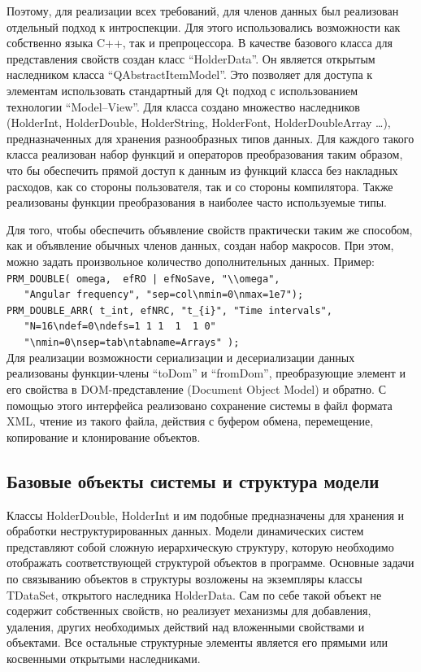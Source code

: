 Поэтому, для реализации всех требований,
для членов данных был реализован отдельный подход к интроспекции.
Для этого использовались возможности как собственно языка C++, так и препроцессора.
В качестве базового класса для представления свойств
создан класс ``HolderData''. Он является открытым наследником
класса ``QAbstractItemModel''. Это позволяет для доступа
к элементам использовать стандартный для Qt подход с
использованием технологии ``Model--View''.
Для класса создано множество наследников
(HolderInt, HolderDouble, HolderString, HolderFont, HolderDoubleArray \ldots),
предназначенных для хранения разнообразных типов данных.
Для каждого такого класса реализован набор функций и операторов преобразования
таким образом, что бы обеспечить прямой доступ к данным из функций класса
без накладных расходов, как со стороны пользователя, так и со стороны
компилятора. Также реализованы функции преобразования в наиболее часто
используемые типы.

Для того, чтобы обеспечить объявление свойств практически таким же способом,
как и объявление обычных членов данных, создан набор макросов.
При этом, можно задать произвольное количество дополнительных данных.
Пример: \\
\verb!PRM_DOUBLE( omega,  efRO | efNoSave, "\\omega",! \\
\verb!   "Angular frequency", "sep=col\nmin=0\nmax=1e7");! \\
\verb!PRM_DOUBLE_ARR( t_int, efNRC, "t_{i}", "Time intervals",!\\
\verb!   "N=16\ndef=0\ndefs=1 1 1  1  1 0"! \\
\verb!   "\nmin=0\nsep=tab\ntabname=Arrays" );!\\

Для реализации возможности сериализации и десериализации данных
реализованы функции-члены ``toDom'' и ``fromDom'',
преобразующие элемент и его свойства в DOM-представление (Document Object Model)
и обратно. С помощью этого интерфейса реализовано сохранение системы
в файл формата XML, чтение из такого файла, действия с буфером обмена,
перемещение, копирование и клонирование объектов.




\subsection{Базовые объекты системы и структура модели}  %

Классы HolderDouble, HolderInt и им подобные предназначены для хранения и обработки
неструктурированных данных. Модели динамических систем
представляют собой сложную иерархическую структуру,
которую необходимо отображать соответствующей структурой объектов в программе.
Основные задачи по связыванию объектов в структуры возложены
на экземпляры классы TDataSet, открытого наследника HolderData.
Сам по себе такой объект не содержит собственных свойств,
но реализует механизмы для добавления, удаления, других необходимых
действий над вложенными свойствами и объектами.
Все остальные структурные элементы является его прямыми или косвенными открытыми наследниками.

